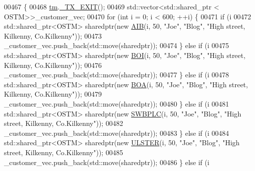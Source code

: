 \begin{DoxyCode}
00467                                                            \{
00468     \hyperlink{class_my_test_c_ase_a422e6e5d4ddedea384be96031c89b72b_a422e6e5d4ddedea384be96031c89b72b}{tm}.\hyperlink{class_t_m_a5e2d1127f2429f2f524d25f430eade06_a5e2d1127f2429f2f524d25f430eade06}{\_TX\_EXIT}();
00469     std::vector<std::shared\_ptr < OSTM>>\_customer\_vec; 
00470      \textcolor{keywordflow}{for} (\textcolor{keywordtype}{int} i = 0; i < 600; ++i) \{
00471         \textcolor{keywordflow}{if} (i %
00472             std::shared\_ptr<OSTM> sharedptr(\textcolor{keyword}{new} \hyperlink{class_a_i_b}{AIB}(i, 50, \textcolor{stringliteral}{"Joe"}, \textcolor{stringliteral}{"Blog"}, \textcolor{stringliteral}{"High street, Kilkenny,
       Co.Kilkenny"}));
00473             \_customer\_vec.push\_back(std::move(sharedptr));
00474         \} \textcolor{keywordflow}{else} \textcolor{keywordflow}{if} (i %
00475             std::shared\_ptr<OSTM> sharedptr(\textcolor{keyword}{new} \hyperlink{class_b_o_i}{BOI}(i, 50, \textcolor{stringliteral}{"Joe"}, \textcolor{stringliteral}{"Blog"}, \textcolor{stringliteral}{"High street, Kilkenny,
       Co.Kilkenny"}));
00476             \_customer\_vec.push\_back(std::move(sharedptr));
00477         \} \textcolor{keywordflow}{else} \textcolor{keywordflow}{if} (i %
00478             std::shared\_ptr<OSTM> sharedptr(\textcolor{keyword}{new} \hyperlink{class_b_o_a}{BOA}(i, 50, \textcolor{stringliteral}{"Joe"}, \textcolor{stringliteral}{"Blog"}, \textcolor{stringliteral}{"High street, Kilkenny,
       Co.Kilkenny"}));
00479             \_customer\_vec.push\_back(std::move(sharedptr));
00480         \} \textcolor{keywordflow}{else} \textcolor{keywordflow}{if} (i %
00481             std::shared\_ptr<OSTM> sharedptr(\textcolor{keyword}{new} \hyperlink{class_s_w_b_p_l_c}{SWBPLC}(i, 50, \textcolor{stringliteral}{"Joe"}, \textcolor{stringliteral}{"Blog"}, \textcolor{stringliteral}{"High street, Kilkenny,
       Co.Kilkenny"}));
00482             \_customer\_vec.push\_back(std::move(sharedptr));
00483         \} \textcolor{keywordflow}{else} \textcolor{keywordflow}{if} (i %
00484             std::shared\_ptr<OSTM> sharedptr(\textcolor{keyword}{new} \hyperlink{class_u_l_s_t_e_r}{ULSTER}(i, 50, \textcolor{stringliteral}{"Joe"}, \textcolor{stringliteral}{"Blog"}, \textcolor{stringliteral}{"High street, Kilkenny,
       Co.Kilkenny"}));
00485             \_customer\_vec.push\_back(std::move(sharedptr));
00486         \} \textcolor{keywordflow}{else} \textcolor{keywordflow}{if} (i %

\end{DoxyCode}
